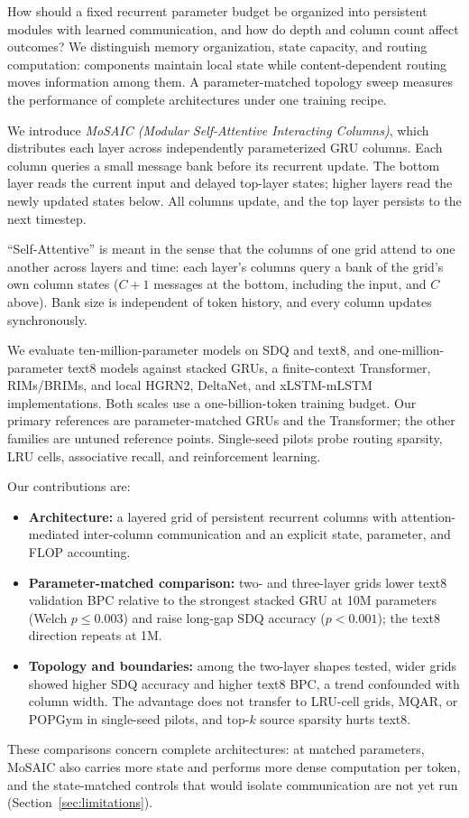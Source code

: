 \documentclass[letterpaper,twoside]{article}
\begin{document}
How should a fixed recurrent parameter budget be organized into persistent modules with learned communication, and how do depth and column count affect outcomes? We distinguish memory organization, state capacity, and routing computation: components maintain local state while content-dependent routing moves information among them. A parameter-matched topology sweep measures the performance of complete architectures under one training recipe.

We introduce \emph{MoSAIC (Modular Self-Attentive Interacting Columns)}, which distributes each layer across independently parameterized GRU columns. Each column queries a small message bank before its recurrent update. The bottom layer reads the current input and delayed top-layer states; higher layers read the newly updated states below. All columns update, and the top layer persists to the next timestep.

``Self-Attentive'' is meant in the sense that the columns of one grid attend to one another across layers and time: each layer's columns query a bank of the grid's own column states ($C+1$ messages at the bottom, including the input, and $C$ above). Bank size is independent of token history, and every column updates synchronously.

We evaluate ten-million-parameter models on SDQ and text8, and one-million-parameter text8 models against stacked GRUs, a finite-context Transformer, RIMs/BRIMs, and local HGRN2, DeltaNet, and xLSTM-mLSTM implementations. Both scales use a one-billion-token training budget. Our primary references are parameter-matched GRUs and the Transformer; the other families are untuned reference points. Single-seed pilots probe routing sparsity, LRU cells, associative recall, and reinforcement learning.

Our contributions are:
\begin{itemize}
    \item \textbf{Architecture:} a layered grid of persistent recurrent columns with attention-mediated inter-column communication and an explicit state, parameter, and FLOP accounting.
    \item \textbf{Parameter-matched comparison:} two- and three-layer grids lower text8 validation BPC relative to the strongest stacked GRU at 10M parameters (Welch $p\le0.003$) and raise long-gap SDQ accuracy ($p<0.001$); the text8 direction repeats at 1M.
    \item \textbf{Topology and boundaries:} among the two-layer shapes tested, wider grids showed higher SDQ accuracy and higher text8 BPC, a trend confounded with column width. The advantage does not transfer to LRU-cell grids, MQAR, or POPGym in single-seed pilots, and top-$k$ source sparsity hurts text8.
\end{itemize}
These comparisons concern complete architectures: at matched parameters, MoSAIC also carries more state and performs more dense computation per token, and the state-matched controls that would isolate communication are not yet run (Section~\ref{sec:limitations}).
\end{document}
